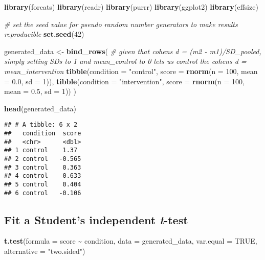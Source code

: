 \documentclass[
]{article}
\newenvironment{Shaded}{\begin{snugshade}}{\end{snugshade}}
\newcommand{\AttributeTok}[1]{\textcolor[rgb]{0.13,0.29,0.53}{#1}}
\newcommand{\CommentTok}[1]{\textcolor[rgb]{0.56,0.35,0.01}{\textit{#1}}}
\newcommand{\ConstantTok}[1]{\textcolor[rgb]{0.56,0.35,0.01}{#1}}
\newcommand{\DecValTok}[1]{\textcolor[rgb]{0.00,0.00,0.81}{#1}}
\newcommand{\FloatTok}[1]{\textcolor[rgb]{0.00,0.00,0.81}{#1}}
\newcommand{\FunctionTok}[1]{\textcolor[rgb]{0.13,0.29,0.53}{\textbf{#1}}}
\newcommand{\NormalTok}[1]{#1}
\newcommand{\OtherTok}[1]{\textcolor[rgb]{0.56,0.35,0.01}{#1}}
\newcommand{\SpecialCharTok}[1]{\textcolor[rgb]{0.81,0.36,0.00}{\textbf{#1}}}
\newcommand{\StringTok}[1]{\textcolor[rgb]{0.31,0.60,0.02}{#1}}
\begin{document}
\begin{Shaded}
\begin{Highlighting}[]
\FunctionTok{library}\NormalTok{(forcats)}
\FunctionTok{library}\NormalTok{(readr)}
\FunctionTok{library}\NormalTok{(purrr) }
\FunctionTok{library}\NormalTok{(ggplot2)}
\FunctionTok{library}\NormalTok{(effsize)}

\CommentTok{\# set the seed value for pseudo random number generators to make results reproducible  }
\FunctionTok{set.seed}\NormalTok{(}\DecValTok{42}\NormalTok{)}

\NormalTok{generated\_data }\OtherTok{\textless{}{-}} 
  \FunctionTok{bind\_rows}\NormalTok{(}
    \CommentTok{\# given that cohen\textquotesingle{}s d = (m2 {-} m1)/SD\_pooled, simply setting SDs to 1 and mean\_control to 0 lets us control the cohen\textquotesingle{}s d = mean\_intervention}
    \FunctionTok{tibble}\NormalTok{(}\AttributeTok{condition =} \StringTok{"control"}\NormalTok{,}
           \AttributeTok{score =} \FunctionTok{rnorm}\NormalTok{(}\AttributeTok{n =} \DecValTok{100}\NormalTok{, }\AttributeTok{mean =} \FloatTok{0.0}\NormalTok{, }\AttributeTok{sd =} \DecValTok{1}\NormalTok{)), }
    \FunctionTok{tibble}\NormalTok{(}\AttributeTok{condition =} \StringTok{"intervention"}\NormalTok{,}
           \AttributeTok{score =} \FunctionTok{rnorm}\NormalTok{(}\AttributeTok{n =} \DecValTok{100}\NormalTok{, }\AttributeTok{mean =} \FloatTok{0.5}\NormalTok{, }\AttributeTok{sd =} \DecValTok{1}\NormalTok{))}
\NormalTok{  )}

\FunctionTok{head}\NormalTok{(generated\_data)}
\end{Highlighting}
\end{Shaded}

\begin{verbatim}
## # A tibble: 6 x 2
##   condition  score
##   <chr>      <dbl>
## 1 control    1.37 
## 2 control   -0.565
## 3 control    0.363
## 4 control    0.633
## 5 control    0.404
## 6 control   -0.106
\end{verbatim}

\hypertarget{fit-a-students-independent-t-test}{%
\subsection{\texorpdfstring{Fit a Student's independent
\emph{t}-test}{Fit a Student's independent t-test}}\label{fit-a-students-independent-t-test}}

\begin{Shaded}
\begin{Highlighting}[]
\FunctionTok{t.test}\NormalTok{(}\AttributeTok{formula =}\NormalTok{ score }\SpecialCharTok{\textasciitilde{}}\NormalTok{ condition, }
       \AttributeTok{data =}\NormalTok{ generated\_data,}
       \AttributeTok{var.equal =} \ConstantTok{TRUE}\NormalTok{,}
       \AttributeTok{alternative =} \StringTok{"two.sided"}\NormalTok{)}
\end{Highlighting}
\end{Shaded}
\end{document}
